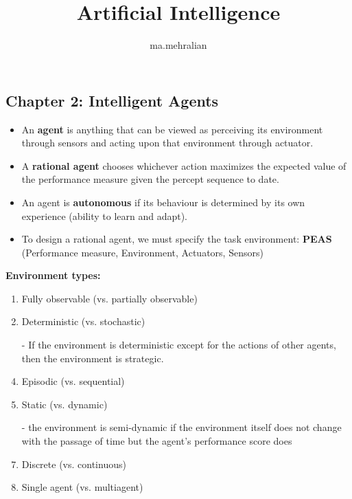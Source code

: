 \documentclass{../cheat}
\title{Artificial Intelligence}
\author{ma.mehralian}
\begin{document}
\begin{multicols}{3}
	\section{Chapter 2: Intelligent Agents}
	
	\begin{itemize}[nolistsep, leftmargin=1em]
		\item An \textbf{agent} is anything that can be viewed as perceiving its environment through sensors and acting upon that environment through actuator.
		\item A \textbf{rational agent} chooses whichever action maximizes the expected value of the performance measure given the percept sequence to date.
		\item An agent is \textbf{autonomous} if its behaviour is determined by its own experience (ability to learn and adapt).
		\item To design a rational agent, we must specify the task environment: \textbf{PEAS} (Performance measure, Environment, Actuators, Sensors)
	\end{itemize}

	\textbf{Environment types:}
	\begin{enumerate}
		\item Fully observable (vs. partially observable)
		\item Deterministic (vs. stochastic)
			\item [-] If the environment is deterministic except for the actions of other agents, then the environment is strategic.
		\item Episodic (vs. sequential)
		\item Static (vs. dynamic)
			\item [-] the environment is semi-dynamic if the environment itself does not change with the passage of time but the agent’s performance score does
		\item Discrete (vs. continuous)
		\item Single agent (vs. multiagent)
	\end{enumerate}
	

\end{multicols}
\end{document}
